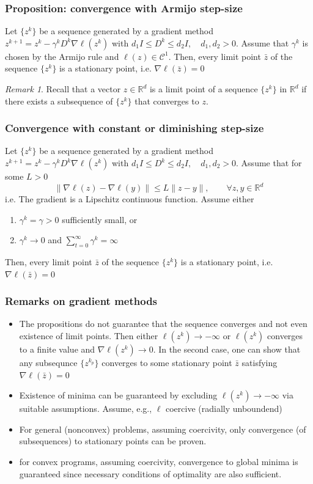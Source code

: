 \documentclass[openany]{book}
\newcommand{\R}{\mathbb{R}} %
\theoremstyle{definition}
\theoremstyle{remark}
\newtheorem*{remark}{Remark} %
\begin{document}
\subsubsection{Proposition: convergence with Armijo step-size}
Let $\{z^k\}$ be a sequence generated by a gradient method $z^{k+1}=z^k-\gamma^kD^k\nabla\ell(z^k)$ with $d_1I\leq D^k \leq d_2I, \quad d_1,d_2>0$. Assume that $\gamma^k$ is chosen by the Armijo rule and $\ell(z)\in \mathcal{C}^1$. Then, every limit point $\bar{z}$ of the sequence $\{z^k\}$ is a stationary point, i.e. $\nabla\ell(\bar{z})=0$
\begin{remark}
Recall that a vector $z\in\R^d$ is a limit point of a sequence $\{z^k\}$ in $\R^d$ if there exists a subsequence of $\{z^k\}$ that converges to $z$.
\end{remark}
\subsubsection{Convergence with constant or diminishing step-size}
Let $\{z^k\}$ be a sequence generated by a gradient method $z^{k+1}=z^k-\gamma^kD^k\nabla\ell(z^k)$ with $d_1I\leq D^k \leq d_2I, \quad d_1,d_2>0$. Assume that for some $L>0$ 
\[
    \|\nabla\ell(z)-\nabla\ell(y)\|\leq L\|z-y\|, \qquad \forall z,y\in\R^d
\]
i.e. The gradient is a Lipschitz continuous function.
Assume either
\begin{enumerate}
    \item $\gamma^k=\gamma>0$ sufficiently small, or 
    \item $\gamma^k\to 0$ and $\displaystyle\sum_{t=0}^{\infty}\gamma^k=\infty$
\end{enumerate}
Then, every limit point $\bar{z}$ of the sequence $\{z^k\}$ is a stationary point, i.e. $\nabla\ell(\bar{z})=0$

\subsubsection{Remarks on gradient methods}
\begin{itemize}
    \item The propositions do not guarantee that the sequence converges and not even existence of limit points. Then either $\ell(z^k)\to-\infty$ or $\ell(z^k)$ converges to a finite value and $\nabla\ell(z^k)\to 0$. In the second case, one can show that any subsequnce $\{z^{k_p}\}$ converges to some stationary point $\bar{z}$ satisfying $\nabla\ell(\bar{z})=0$
    \item Existence of minima can be guaranteed by excluding $\ell(z^k)\to-\infty$ via suitable assumptions. Assume, e.g., $\ell$ coercive (radially unboundend)
    \item For general (nonconvex) problems, assuming coercivity, only convergence (of subsequences) to stationary points can be proven.
    \item for convex programs, assuming coercivity, convergence to global minima is guaranteed since necessary conditions of optimality are also sufficient.
\end{itemize}
\end{document}
